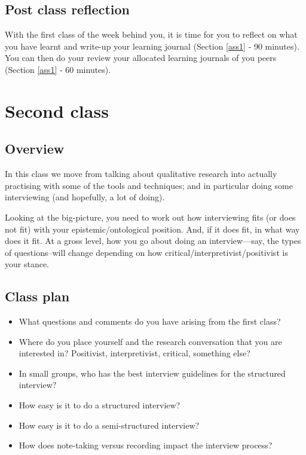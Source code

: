 \documentclass[]{book}
\theoremstyle{definition}
\theoremstyle{definition}
\theoremstyle{definition}
\theoremstyle{remark}
\begin{document}
\hypertarget{post-class-reflection}{%
\subsection{Post class reflection}\label{post-class-reflection}}

With the first class of the week behind you, it is time for you to
reflect on what you have learnt and write-up your learning journal
(Section \ref{ass1} ‐ 90 minutes). You can then do your review your
allocated learning journals of you peers (Section \ref{ass1} ‐ 60
minutes).

\hypertarget{second-class}{%
\section*{Second class}\label{second-class}}

\hypertarget{overview-1}{%
\subsection*{Overview}\label{overview-1}}

In this class we move from talking about qualitative research into
actually practising with some of the tools and techniques; and in
particular doing some interviewing (and hopefully, a lot of doing).

Looking at the big-picture, you need to work out how interviewing fits
(or does not fit) with your epistemic/ontological position. And, if it
does fit, in what way does it fit. At a gross level, how you go about
doing an interview---say, the types of questions--will change depending
on how critical/interpretivist/positivist is your stance.

\hypertarget{class-plan-1}{%
\subsection*{Class plan}\label{class-plan-1}}

\begin{itemize}
\item
  What questions and comments do you have arising from the first class?
\item
  Where do you place yourself and the research conversation that you are
  interested in? Positivist, interpretivist, critical, something else?
\item
  In small groups, who has the best interview guidelines for the
  structured interview?
\item
  How easy is it to do a structured interview?
\item
  How easy is it to do a semi-structured interview?
\item
  How does note-taking versus recording impact the interview process?
\end{itemize}
\end{document}

